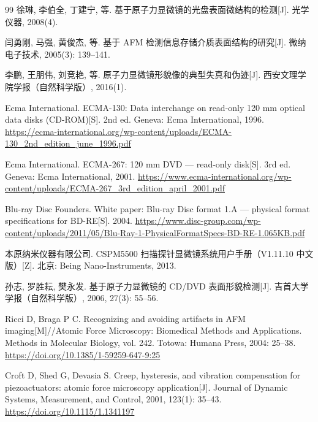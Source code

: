 \begin{thebibliography}{99}
徐琳, 李伯全, 丁建宁, 等. 基于原子力显微镜的光盘表面微结构的检测[J]. 光学仪器, 2008(4).

闫勇刚, 马强, 黄俊杰, 等. 基于 AFM 检测信息存储介质表面结构的研究[J]. 微纳电子技术, 2005(3): 139--141.

李鹏, 王朋伟, 刘竞艳, 等. 原子力显微镜形貌像的典型失真和伪迹[J]. 西安文理学院学报（自然科学版）, 2016(1).

Ecma International. ECMA-130: Data interchange on read-only 120 mm optical data disks (CD-ROM)[S]. 2nd ed. Geneva: Ecma International, 1996.
\url{https://ecma-international.org/wp-content/uploads/ECMA-130_2nd_edition_june_1996.pdf}

Ecma International. ECMA-267: 120 mm DVD --- read-only disk[S]. 3rd ed. Geneva: Ecma International, 2001.
\url{https://www.ecma-international.org/wp-content/uploads/ECMA-267_3rd_edition_april_2001.pdf}

Blu-ray Disc Founders. White paper: Blu-ray Disc format 1.A --- physical format specifications for BD-RE[S]. 2004.
\url{https://www.disc-group.com/wp-content/uploads/2011/05/Blu-Ray-1-PhysicalFormatSpecs-BD-RE-1.065KB.pdf}

本原纳米仪器有限公司. CSPM5500 扫描探针显微镜系统用户手册（V1.11.10 中文版）[Z]. 北京: Being Nano-Instruments, 2013.

孙志, 罗胜耘, 樊永发. 基于原子力显微镜的 CD/DVD 表面形貌检测[J]. 吉首大学学报（自然科学版）, 2006, 27(3): 55--56.

Ricci D, Braga P C. Recognizing and avoiding artifacts in AFM imaging[M]//Atomic Force Microscopy: Biomedical Methods and Applications. Methods in Molecular Biology, vol. 242. Totowa: Humana Press, 2004: 25--38.
\url{https://doi.org/10.1385/1-59259-647-9:25}

Croft D, Shed G, Devasia S. Creep, hysteresis, and vibration compensation for piezoactuators: atomic force microscopy application[J]. Journal of Dynamic Systems, Measurement, and Control, 2001, 123(1): 35--43.
\url{https://doi.org/10.1115/1.1341197}

\end{thebibliography}
